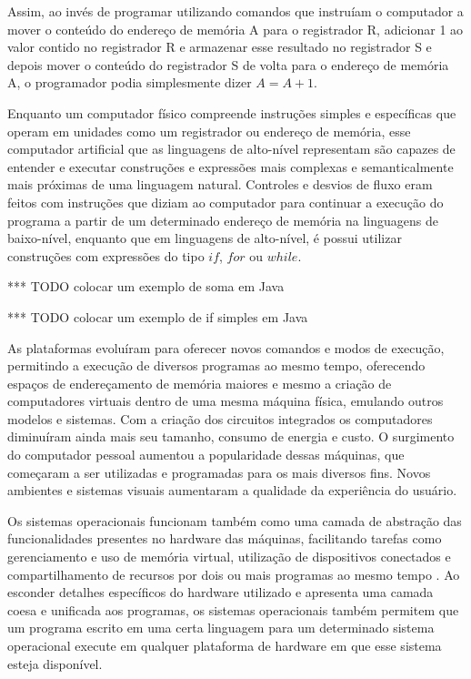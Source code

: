 \documentclass[11pt,twoside,a4paper]{book}
\begin{document}
Assim, ao invés de programar utilizando comandos que instruíam o computador a mover o conteúdo do endereço de memória A para o registrador R, adicionar 1 ao valor contido no registrador R e armazenar esse resultado no registrador S e depois mover o conteúdo do registrador S de volta para o endereço de memória A, o programador podia simplesmente dizer $A = A + 1$.

Enquanto um computador físico compreende instruções simples e específicas que operam em unidades como um registrador ou endereço de memória, esse computador artificial que as linguagens de alto-nível representam são capazes de entender e executar construções e expressões mais complexas e semanticalmente mais próximas de uma linguagem natural. Controles e desvios de fluxo eram feitos com instruções que diziam ao computador para continuar a execução do programa a partir de um determinado endereço de memória na linguagens de baixo-nível, enquanto que em linguagens de alto-nível, é possui utilizar construções com expressões do tipo $if$, $for$ ou $while$.

*** TODO colocar um exemplo de soma em Java

*** TODO colocar um exemplo de if simples em Java

As plataformas evoluíram para oferecer novos comandos e modos de execução, permitindo a execução de diversos programas ao mesmo tempo, oferecendo espaços de endereçamento de memória maiores e mesmo a criação de computadores virtuais dentro de uma mesma máquina física, emulando outros modelos e sistemas. Com a criação dos circuitos integrados os computadores diminuíram ainda mais seu tamanho, consumo de energia e custo. O surgimento do computador pessoal aumentou a popularidade dessas máquinas, que começaram a ser utilizadas e programadas para os mais diversos fins. Novos ambientes e sistemas visuais aumentaram a qualidade da experiência do usuário.

Os sistemas operacionais funcionam também como uma camada de abstração das funcionalidades presentes no hardware das máquinas, facilitando tarefas como gerenciamento e uso de memória virtual, utilização de dispositivos conectados e compartilhamento de recursos por dois ou mais programas ao mesmo tempo \cite{so}. Ao esconder detalhes específicos do hardware utilizado e apresenta uma camada coesa e unificada aos programas, os sistemas operacionais também permitem que um programa escrito em uma certa linguagem para um determinado sistema operacional execute em qualquer plataforma de hardware em que esse sistema esteja disponível. 
\end{document}
